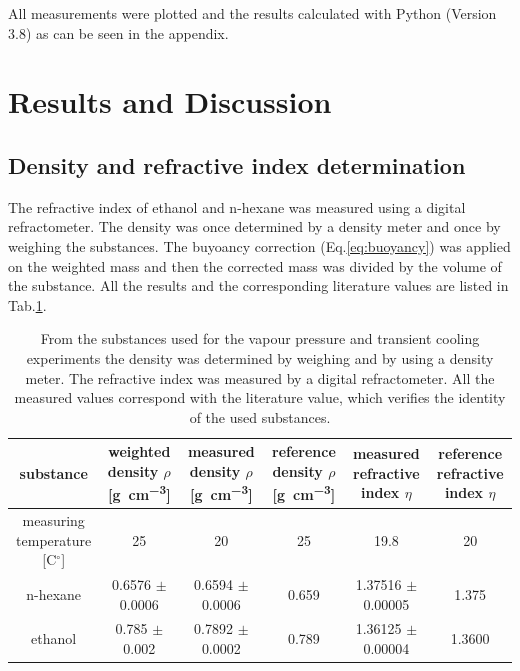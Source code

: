 \documentclass[a4paper,abstracton]{article}	                       %
\renewcommand{\cite}{\supercite}						%
\begin{document}
All measurements were plotted and the results calculated with Python (Version 3.8) as can be seen in the appendix. 

\newpage
\section*{Results and Discussion}
\subsection*{Density and refractive index determination}
The refractive index of ethanol and n-hexane was measured using a digital refractometer. The density was once determined by a density meter and once by weighing the substances. The buyoancy correction (Eq.\ref{eq:buoyancy}) was applied on the weighted mass and then the corrected mass was divided by the volume of the substance. All the results and the corresponding literature values are listed in Tab.\ref{tab:Teil1}. 

\begin{table}[H]
\centering
\begin{tabular}{c|c|c|c|c|c}
    substance &\thead{weighted\\ density $\rho$ [\si{\gram\per\cubic\centi\metre}]} &\thead{measured\\ density $\rho$ [\si{\gram\per\cubic\centi\metre}]} &\thead{reference \\ density $\rho$ [\si{\gram\per\cubic\centi\metre}]} & \thead{measured\\ refractive index $\eta$}& \thead{reference\\ refractive index $\eta$}\\
    \hline
    \thead{measuring\\ temperature [C$^{\circ}$]} & 25 & 20 & 25 & 19.8 & 20 \\
     \hline
    n-hexane & 0.6576 $\pm$ 0.0006 & 0.6594 $\pm$ 0.0006 & 0.659\cite{nhexane} & 1.37516 $\pm$ 0.00005 & 1.375\cite{nhexane}\\
    ethanol & 0.785 $\pm$ 0.002 & 0.7892 $\pm$ 0.0002 & 0.789\cite{ethanol} & 1.36125 $\pm$ 0.00004 & 1.3600\cite{ethanol}\\
\end{tabular}
\caption{\label{tab:Teil1} From the substances used for the vapour pressure and transient cooling experiments the density was determined by weighing and by using a density meter. The refractive index was measured by a digital refractometer. All the measured values correspond with the literature value, which verifies the identity of the used substances.}
\end{table}
\end{document}
